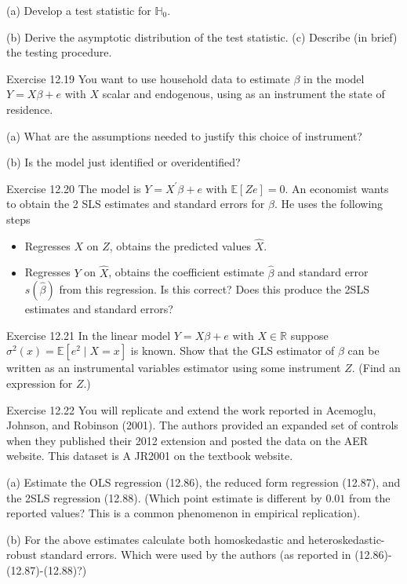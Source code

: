 \documentclass[10pt]{article}
\begin{document}
(a) Develop a test statistic for $\mathbb{H}_{0}$.

(b) Derive the asymptotic distribution of the test statistic. (c) Describe (in brief) the testing procedure.

Exercise 12.19 You want to use household data to estimate $\beta$ in the model $Y=X \beta+e$ with $X$ scalar and endogenous, using as an instrument the state of residence.

(a) What are the assumptions needed to justify this choice of instrument?

(b) Is the model just identified or overidentified?

Exercise 12.20 The model is $Y=X^{\prime} \beta+e$ with $\mathbb{E}[Z e]=0$. An economist wants to obtain the 2 SLS estimates and standard errors for $\beta$. He uses the following steps

\begin{itemize}
  \item Regresses $X$ on $Z$, obtains the predicted values $\widehat{X}$.

  \item Regresses $Y$ on $\widehat{X}$, obtains the coefficient estimate $\widehat{\beta}$ and standard error $s(\widehat{\beta})$ from this regression. Is this correct? Does this produce the 2SLS estimates and standard errors?

\end{itemize}
Exercise 12.21 In the linear model $Y=X \beta+e$ with $X \in \mathbb{R}$ suppose $\sigma^{2}(x)=\mathbb{E}\left[e^{2} \mid X=x\right]$ is known. Show that the GLS estimator of $\beta$ can be written as an instrumental variables estimator using some instrument $Z$. (Find an expression for $Z$.)

Exercise 12.22 You will replicate and extend the work reported in Acemoglu, Johnson, and Robinson (2001). The authors provided an expanded set of controls when they published their 2012 extension and posted the data on the AER website. This dataset is A JR2001 on the textbook website.

(a) Estimate the OLS regression (12.86), the reduced form regression (12.87), and the 2SLS regression (12.88). (Which point estimate is different by $0.01$ from the reported values? This is a common phenomenon in empirical replication).

(b) For the above estimates calculate both homoskedastic and heteroskedastic-robust standard errors. Which were used by the authors (as reported in (12.86)-(12.87)-(12.88)?)
\end{document}
